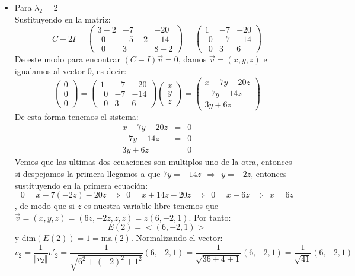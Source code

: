 \begin{itemize}
\begin{itemize}
        \item Para $\lambda_2=2$\\
        Sustituyendo en la matriz:
        \[C-2I=\begin{pmatrix}3-2&-7&-20\\ \:\:0&-5-2&-14\\ \:\:0&3&8-2\end{pmatrix}=\begin{pmatrix}1&-7&-20\\ \:\:0&-7&-14\\ \:\:0&3&6\end{pmatrix}\]
        De este modo para encontrar $(C-I)\Vec{v}=0$, damos $\vec{v}=(x,y,z)$ e igualamos al vector 0, es decir:
        \[\begin{pmatrix}0\\0\\0\end{pmatrix}=\begin{pmatrix}1&-7&-20\\ \:\:0&-7&-14\\ \:\:0&3&6\end{pmatrix}\begin{pmatrix}x\\y\\z\end{pmatrix}=\begin{pmatrix}x-7y-20z\\-7y-14z\\3y+6z\end{pmatrix}\]
        De esta forma tenemos el sistema:
        \begin{eqnarray*}
        x-7y-20z&=&0\\
        -7y-14z&=&0\\
        3y+6z&=&0
        \end{eqnarray*}
        Vemos que las ultimas dos ecuaciones son multiplos uno de la otra, entonces si despejamos la primera llegamos a que $\displaystyle 7y=-14z~~\Longrightarrow~~y=-2z$, entonces
        sustituyendo en la primera ecuaci\'on:
        \[0=x-7\left(-2z\right)-20z~~\Longrightarrow~~0=x+14z-20z~~\Longrightarrow~~0=x-6z~~\Longrightarrow~~x=6z\], de modo que si $z$ es nuestra variable libre tenemos que $\displaystyle \vec{v}=(x,y,z)=\left(6z,-2z,z,z\right)=z(6,-2,1)$. Por tanto:
        \[E(2)=<(6,-2,1)>\]
        y $\text{dim}(E(2))=1=\text{ma}(2)$. 
        Normalizando el vector:
        \[v_2=\frac{1}{\Vert v_2\Vert}v'_2=\frac{1}{\sqrt{6^2+(-2)^2+1^2}}(6,-2,1)=\frac{1}{\sqrt{36+4+1}}(6,-2,1)=\frac{1}{\sqrt{41}}(6,-2,1)\]
        

\end{itemize}
\end{itemize}
